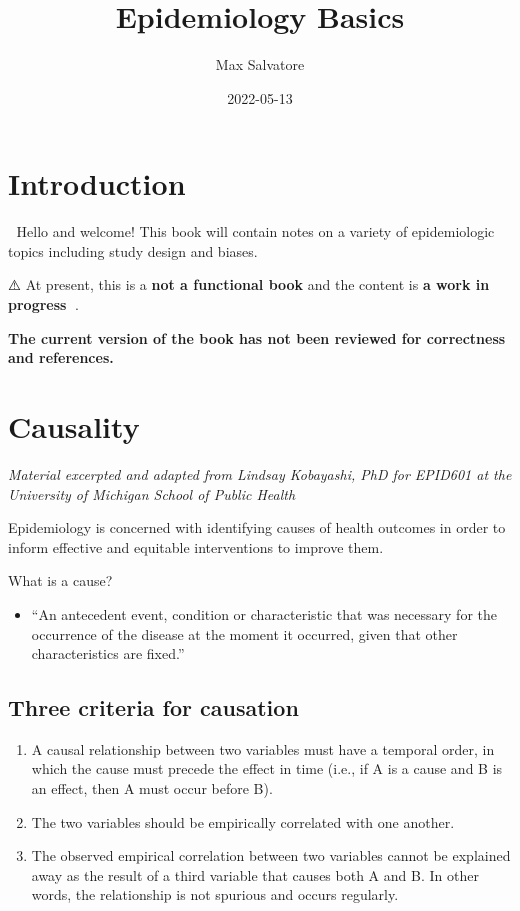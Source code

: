 \documentclass[
]{book}
\title{Epidemiology Basics}
\author{Max Salvatore}
\date{2022-05-13}
\providecommand{\tightlist}{%
  \setlength{\itemsep}{0pt}\setlength{\parskip}{0pt}}
\begin{document}
\maketitle

{
\setcounter{tocdepth}{1}
\tableofcontents
}
\hypertarget{introduction}{%
\chapter{Introduction}\label{introduction}}

👋 Hello and welcome! This book will contain notes on a variety of epidemiologic topics including study design and biases.

⚠️ At present, this is a \textbf{not a functional book} and the content is \textbf{a work in progress} 🔧.

\textbf{The current version of the book has not been reviewed for correctness and references.}

\hypertarget{causality}{%
\chapter{Causality}\label{causality}}

\emph{Material excerpted and adapted from Lindsay Kobayashi, PhD for EPID601 at the University of Michigan School of Public Health}

Epidemiology is concerned with identifying causes of health outcomes in order to inform effective and equitable interventions to improve them.

What is a cause?

\begin{itemize}
\tightlist
\item
  ``An antecedent event, condition or characteristic that was necessary for the occurrence of the disease at the moment it occurred, given that other characteristics are fixed.''
\end{itemize}

\hypertarget{three-criteria-for-causation}{%
\section{Three criteria for causation}\label{three-criteria-for-causation}}

\begin{enumerate}
\def\labelenumi{\arabic{enumi}.}
\tightlist
\item
  A causal relationship between two variables must have a temporal order, in which the cause must precede the effect in time (i.e., if A is a cause and B is an effect, then A must occur before B).
\item
  The two variables should be empirically correlated with one another.
\item
  The observed empirical correlation between two variables cannot be explained away as the result of a third variable that causes both A and B. In other words, the relationship is not spurious and occurs regularly.
\end{enumerate}
\end{document}
